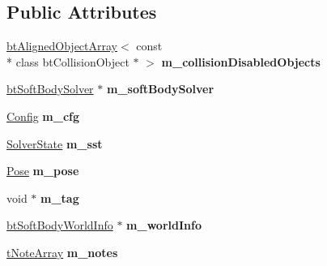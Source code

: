 \subsection*{Public Attributes}
\begin{DoxyCompactItemize}
\item 
\hypertarget{classbt_soft_body_a60857c2994e206fd476b4f581c468c8d}{\hyperlink{classbt_aligned_object_array}{bt\+Aligned\+Object\+Array}$<$ const \\*
class bt\+Collision\+Object $\ast$ $>$ {\bfseries m\+\_\+collision\+Disabled\+Objects}}\label{classbt_soft_body_a60857c2994e206fd476b4f581c468c8d}

\item 
\hypertarget{classbt_soft_body_afa4f3a40b43a4e10d77e52ecbb3bf571}{\hyperlink{classbt_soft_body_solver}{bt\+Soft\+Body\+Solver} $\ast$ {\bfseries m\+\_\+soft\+Body\+Solver}}\label{classbt_soft_body_afa4f3a40b43a4e10d77e52ecbb3bf571}

\item 
\hypertarget{classbt_soft_body_a6c8ea8006fb5e716361a7d66cf00daab}{\hyperlink{structbt_soft_body_1_1_config}{Config} {\bfseries m\+\_\+cfg}}\label{classbt_soft_body_a6c8ea8006fb5e716361a7d66cf00daab}

\item 
\hypertarget{classbt_soft_body_a329525a55d20b3a388b92b234fd15b5f}{\hyperlink{structbt_soft_body_1_1_solver_state}{Solver\+State} {\bfseries m\+\_\+sst}}\label{classbt_soft_body_a329525a55d20b3a388b92b234fd15b5f}

\item 
\hypertarget{classbt_soft_body_a3c1d3c3e9f60e3d97f08245a82fa0ed3}{\hyperlink{structbt_soft_body_1_1_pose}{Pose} {\bfseries m\+\_\+pose}}\label{classbt_soft_body_a3c1d3c3e9f60e3d97f08245a82fa0ed3}

\item 
\hypertarget{classbt_soft_body_abd99c0f3e6d2a2e227d38421374ce173}{void $\ast$ {\bfseries m\+\_\+tag}}\label{classbt_soft_body_abd99c0f3e6d2a2e227d38421374ce173}

\item 
\hypertarget{classbt_soft_body_a4a2ef515395ec9c49b1c550bb20dc724}{\hyperlink{structbt_soft_body_world_info}{bt\+Soft\+Body\+World\+Info} $\ast$ {\bfseries m\+\_\+world\+Info}}\label{classbt_soft_body_a4a2ef515395ec9c49b1c550bb20dc724}

\item 
\hypertarget{classbt_soft_body_ab2d4d22ffbeed6ae64366f94e1e72fa2}{\hyperlink{classbt_aligned_object_array}{t\+Note\+Array} {\bfseries m\+\_\+notes}}\label{classbt_soft_body_ab2d4d22ffbeed6ae64366f94e1e72fa2}


\end{DoxyCompactItemize}
